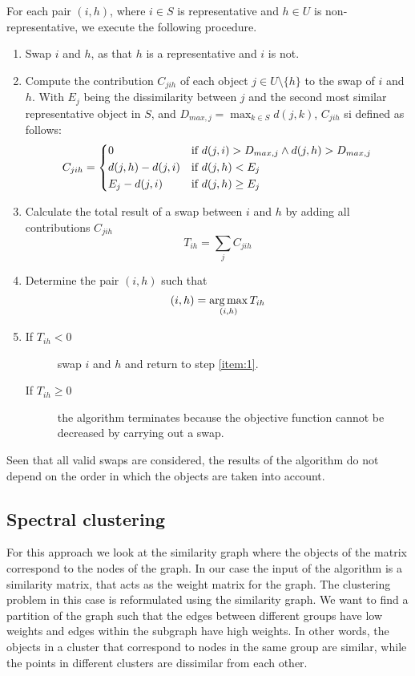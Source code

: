 For each pair $(i,h)$, where $i \in S$ is representative and $h \in U$ is non-representative, we execute the following procedure.
\begin{enumerate}
    \item Swap $i$ and $h$, as that $h$ is a representative and $i$ is not.\label{item:1}
    \item Compute the contribution $C_{jih}$ of each object $j \in U\setminus \{h\}$ to the swap of $i$ and $h$. With $E_j$ being the dissimilarity between $j$ and the second most similar representative object in $S$, and $D_{max,j} = \max_{k\in S}{d(j,k)}$, $C_{jih}$ si defined as follows:
    \begin{equation*}
        C_{jih}=
        \begin{dcases}
            0 & \text{if } d(j,i)> D_{max,j}\land d(j,h)> D_{max,j}\\
            d(j,h)-d(j,i) & \text{if } d(j,h)<E_j  \\
            E_j-d(j,i) & \text{if } d(j,h)\geq E_j \\
        \end{dcases}
    \end{equation*}  
    \item Calculate the total result of a swap between $i$ and $h$ by adding all contributions $C_{jih}$
    \begin{equation*}
        T_{ih}=\sum_j{C_{jih}}
    \end{equation*}
    \item Determine the pair $(i,h)$ such that
    \begin{equation*}
        (i,h)=\operatorname*{arg\,max}_{(i,h)}{T_{ih}}
    \end{equation*}
    \item 
    \begin{description}
        \item[If $T_{ih}<0$] swap $i$ and $h$ and return to step \ref{item:1}.
        \item[If $T_{ih}\geq 0$] the algorithm terminates because the objective function cannot be decreased by carrying out a swap.
    \end{description}
\end{enumerate}
Seen that all valid swaps are considered, the results of the algorithm do not depend on the order in which the objects are taken into account.

\subsection{Spectral clustering}\label{clustering_spectral}
For this approach we look at the similarity graph where the objects of the matrix correspond to the nodes of the graph. In our case the input of the algorithm is a similarity matrix, that acts as the weight matrix for the graph. The clustering problem in this case is reformulated using the similarity graph. We want to find a partition of the graph such that the edges between different groups have low weights and edges within the subgraph have high weights. In other words, the objects in a cluster that correspond to nodes in the same group are similar, while the points in different clusters are dissimilar from each other.

